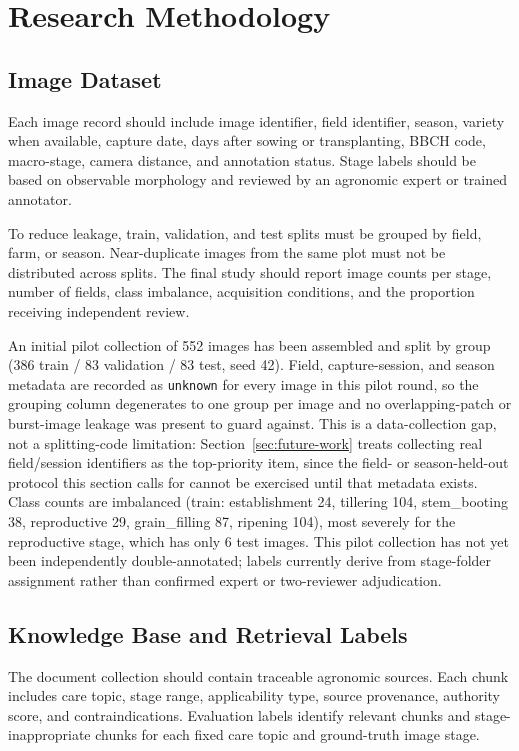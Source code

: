 \documentclass[conference]{IEEEtran}
\begin{document}
\section{Research Methodology}
\subsection{Image Dataset}
Each image record should include image identifier, field identifier, season, variety when available, capture date, days after sowing or transplanting, BBCH code, macro-stage, camera distance, and annotation status. Stage labels should be based on observable morphology and reviewed by an agronomic expert or trained annotator.

To reduce leakage, train, validation, and test splits must be grouped by field, farm, or season. Near-duplicate images from the same plot must not be distributed across splits. The final study should report image counts per stage, number of fields, class imbalance, acquisition conditions, and the proportion receiving independent review.

An initial pilot collection of 552 images has been assembled and split by group (386 train / 83 validation / 83 test, seed 42). Field, capture-session, and season metadata are recorded as \texttt{unknown} for every image in this pilot round, so the grouping column degenerates to one group per image and no overlapping-patch or burst-image leakage was present to guard against. This is a data-collection gap, not a splitting-code limitation: Section~\ref{sec:future-work} treats collecting real field/session identifiers as the top-priority item, since the field- or season-held-out protocol this section calls for cannot be exercised until that metadata exists. Class counts are imbalanced (train: establishment 24, tillering 104, stem\_booting 38, reproductive 29, grain\_filling 87, ripening 104), most severely for the reproductive stage, which has only 6 test images. This pilot collection has not yet been independently double-annotated; labels currently derive from stage-folder assignment rather than confirmed expert or two-reviewer adjudication.

\subsection{Knowledge Base and Retrieval Labels}
The document collection should contain traceable agronomic sources. Each chunk includes care topic, stage range, applicability type, source provenance, authority score, and contraindications. Evaluation labels identify relevant chunks and stage-inappropriate chunks for each fixed care topic and ground-truth image stage.
\end{document}
